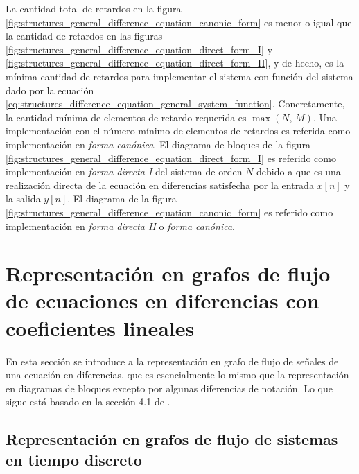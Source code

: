 \documentclass[a4paper]{report}
\begin{document}
La cantidad total de retardos en la figura \ref{fig:structures_general_difference_equation_canonic_form} es menor o igual que la cantidad de retardos en las figuras \ref{fig:structures_general_difference_equation_direct_form_I} y \ref{fig:structures_general_difference_equation_direct_form_II}, y de hecho, es la mínima cantidad de retardos para implementar el sistema con función del sistema dado por la ecuación \ref{eq:structures_difference_equation_general_system_function}. Concretamente, la cantidad mínima de elementos de retardo requerida es \(\max(N,\,M)\). Una implementación con el número mínimo de elementos de retardos es referida como implementación en \emph{forma canónica}. El diagrama de bloques de la figura \ref{fig:structures_general_difference_equation_direct_form_I} es referido como implementación en \emph{forma directa I} del sistema de orden \(N\) debido a que es una realización directa de la ecuación en diferencias satisfecha por la entrada \(x[n]\) y la salida \(y[n]\). El diagrama de la figura \ref{fig:structures_general_difference_equation_canonic_form} es referido como implementación en \emph{forma directa II} o \emph{forma canónica}.
 
\section{Representación en grafos de flujo de ecuaciones en diferencias con coeficientes lineales} 
 
En esta sección se introduce a la representación en grafo de flujo de señales de una ecuación en diferencias, que es esencialmente lo mismo que la representación en diagramas de bloques excepto por algunas diferencias de notación. Lo que sigue está basado en la sección 4.1 de \cite{oppenheim75digital}.

\subsection{Representación en grafos de flujo de sistemas en tiempo discreto}
\end{document}
